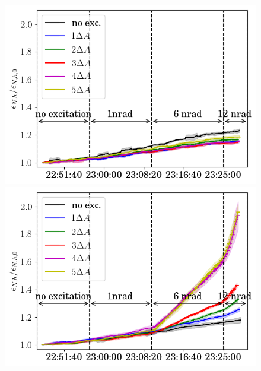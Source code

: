 \documentclass[%
 reprint,
 amsmath,amssymb,
 aps,
prstab,
]{revtex4-1}
\begin{document}
\begin{figure}[h]
\begin{minipage}[t]{0.49\linewidth}
	\end{minipage}	
	\begin{minipage}[t]{0.49\linewidth}
		\centering
		\includegraphics[width=1.0\linewidth]{2017_emith_avg_rel_vran_no_damper.png}
	\end{minipage}	
	\begin{minipage}[t]{0.49\linewidth}
		\centering
		\includegraphics[width=1.0\linewidth]{2017_emith_avg_rel_hvran_no_damper.png}
	\end{minipage}	
	\begin{minipage}[t]{0.49\linewidth}
		\centering

\end{minipage}
\end{figure}
\end{document}
